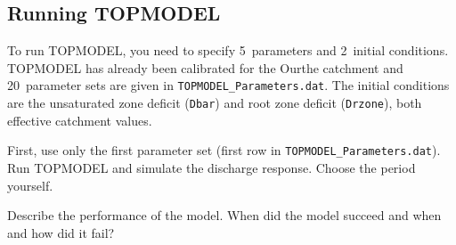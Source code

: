 \documentclass[twocolumn, 10pt, a4paper]{article}
\newenvironment{PC_prac_environment}{
\def\Q{\noindent \color{Gray}\rule[-0.1cm]{\columnwidth}{1.5pt}  \color{black} } \let\ques\Q 
\def\nQ{\noindent \color{black} } \let\ques\nQ 
\def\E{\color{Gray}\rule[0.3cm]{\columnwidth}{1.5pt} \color{black}} \let\ques\E }
\newcommand{\A}[2] { \ifthenelse{\boolean{showanswer}} {\noindent \color{cyan}{#2}\color{black}} {\multido{}{#1}{\noindent \color{light-gray}\hrulefill\\} } }
\begin{document}
\begin{PC_prac_environment}
\subsection{Running TOPMODEL}
To run TOPMODEL, you need to specify 5~parameters and 2~initial conditions. 
TOPMODEL has already been calibrated for the Ourthe catchment and 20~parameter sets are given in \verb!TOPMODEL_Parameters.dat!. The initial conditions are the unsaturated zone deficit (\texttt{Dbar}) and  root zone deficit (\texttt{Drzone}), both effective catchment values.

First, use only the first parameter set (first row in \verb!TOPMODEL_Parameters.dat!). Run TOPMODEL and simulate the discharge response. Choose the period yourself. 

\Q Describe the performance of the model. When did the model succeed and when and how did it fail?\\
\E


\end{PC_prac_environment}
\end{document}
